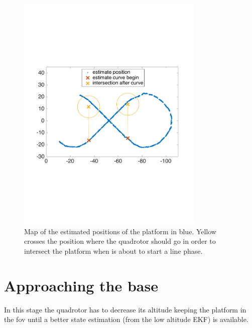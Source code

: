 \begin{figure}[!htbp]
    \centering
    \includegraphics[width=0.8\textwidth]{img/following_platform_normal_map_intersection.pdf}
    \caption{Map of the estimated positions of the platform in blue.  Yellow crosses the position where the quadrotor should go in order to intersect the platform when is about to start a line phase.}
    \label{fig:map_intersections}
\end{figure}

\section{Approaching the base}
In this stage the quadrotor has to decrease its altitude keeping the platform in the fov until a better state estimation (from the low altitude EKF) is available.\\

